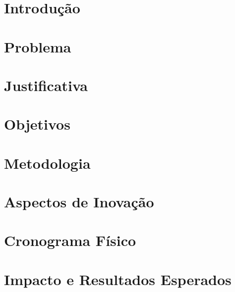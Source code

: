 \documentclass[11pt,oneside,a4paper,english,french,spanish,brazil]{abntex2}
\begin{document}
            \chapter{Introdução}\label{cap:introducao}
            
            
            \chapter{Problema}\label{cap:problema}
            

            \chapter{Justificativa}\label{cap:justificativa}
            

            \chapter{Objetivos}\label{cap:objetivos}
            

            \chapter{Metodologia}\label{cap:metodologia}
            

            \chapter{Aspectos de Inovação}\label{cap:inovacao}
            
            
            \chapter{Cronograma Físico}\label{cap:cronograma}
            
            
            \chapter{Impacto e Resultados Esperados}\label{cap:impacto}
            
          
\end{document}
